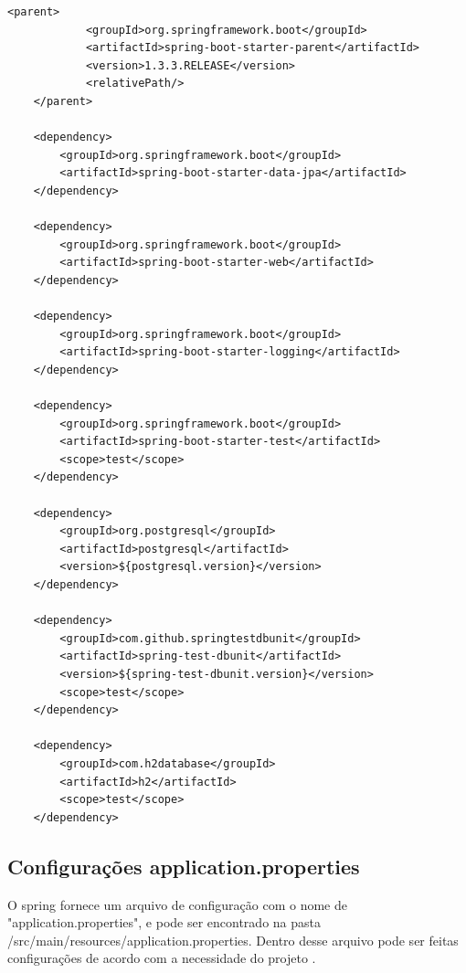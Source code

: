 \begin{lstlisting}[style=XML,label=Func:POMMonitorWebApi,caption={[Arquivo POM com as principais dependências do projeto.]Arquivo POM com as principais dependências do projeto.}]
	<parent>
			<groupId>org.springframework.boot</groupId>
			<artifactId>spring-boot-starter-parent</artifactId>
			<version>1.3.3.RELEASE</version>
			<relativePath/>
	</parent>
	
	<dependency>
		<groupId>org.springframework.boot</groupId>
		<artifactId>spring-boot-starter-data-jpa</artifactId>
	</dependency>
	
	<dependency>
		<groupId>org.springframework.boot</groupId>
		<artifactId>spring-boot-starter-web</artifactId>
	</dependency>

	<dependency>
		<groupId>org.springframework.boot</groupId>
		<artifactId>spring-boot-starter-logging</artifactId>
	</dependency>

	<dependency>
		<groupId>org.springframework.boot</groupId>
		<artifactId>spring-boot-starter-test</artifactId>
		<scope>test</scope>
	</dependency>
				
	<dependency>
		<groupId>org.postgresql</groupId>
		<artifactId>postgresql</artifactId>
		<version>${postgresql.version}</version>
	</dependency>

	<dependency>
		<groupId>com.github.springtestdbunit</groupId>
		<artifactId>spring-test-dbunit</artifactId>
		<version>${spring-test-dbunit.version}</version>
		<scope>test</scope>
	</dependency>

	<dependency>
		<groupId>com.h2database</groupId>
		<artifactId>h2</artifactId>
		<scope>test</scope>
	</dependency>
\end{lstlisting}



\subsection{Configurações application.properties}\label{subsec:ConfiguraçõesApplicationProperties}

O spring fornece um arquivo de configuração com o nome de "application.properties", e pode ser encontrado na pasta /src/main/resources/application.properties. Dentro desse arquivo pode ser feitas configurações de acordo com a necessidade do projeto \cite{springBoot:2017}.

